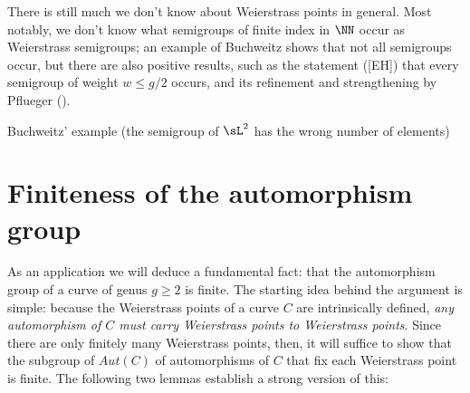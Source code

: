 %
%

There is still much we don't know about Weierstrass points in general. Most notably, we don't know what semigroups of finite index in $\NN$ occur as Weierstrass semigroups; an example of Buchweitz shows that not all semigroups occur, but there are also positive results, such as the statement ([EH]) that every semigroup of weight $w \leq g/2$ occurs, and its refinement and strengthening by Pflueger (\cite{**}).

\begin{exercise}
Buchweitz' example (the semigroup of $\sL^2$ has the wrong number of elements)
\end{exercise}

 



\section{Finiteness of the automorphism group}

As an application we will deduce a fundamental fact: that the automorphism group of a curve of genus $g\geq 2$ is finite. The starting idea behind the argument is simple: because the Weierstrass points of a curve $C$ are intrinsically defined, \emph{any automorphism of $C$ must carry Weierstrass points to Weierstrass points}. Since there are only finitely many Weierstrass points, then, it will suffice to show that the subgroup of $Aut(C)$ of automorphisms of $C$ that fix each  Weierstrass point is finite. The following two lemmas establish a strong version of this:

